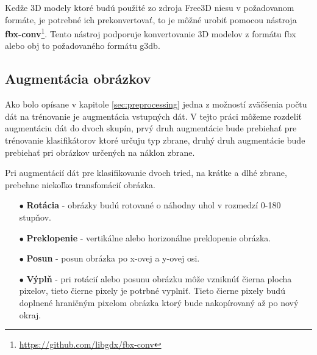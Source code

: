 Kedže 3D modely ktoré budú použité zo zdroja Free3D niesu v požadovanom formáte, je potrebné ich prekonvertovať, to je môžné urobiť
    pomocou nástroja \textbf{fbx-conv}\footnote{\url{https://github.com/libgdx/fbx-conv}}.
Tento nástroj podporuje konvertovanie 3D modelov z formátu fbx alebo obj to požadovaného formátu g3db.

\subsection{Augmentácia obrázkov}
Ako bolo opísane v kapitole \ref{sec:preprocessing} jedna z možností zväčšenia počtu dát na trénovanie je augmentácia vstupných dát.
V tejto práci môžeme rozdeliť augmentáciu dát do dvoch skupín, prvý druh augmentácie bude prebiehať pre trénovanie klasifikátorov ktoré
    určuju typ zbrane, druhý druh augmentácie bude prebiehať pri obrázkov určených na náklon zbrane.

Pri augmentácií dát pre klasifikovanie dvoch tried, na krátke a dlhé zbrane, prebehne niekoľko transfomácií obrázka.
\begin{enumerate}
    \item[$\bullet$] \textbf{Rotácia} - obrázky budú rotované o náhodny uhol v rozmedzí 0-180 stupňov.
    \item[$\bullet$] \textbf{Preklopenie} - vertikálne alebo horizonálne preklopenie obrázka.
    \item[$\bullet$] \textbf{Posun} - posun obrázka po x-ovej a y-ovej osi.
    \item[$\bullet$] \textbf{Výplň} - pri rotácií alebo posunu obrázku môže vzniknúť čierna plocha pixelov, tieto čierne pixely je potrbné vyplniť.
    Tieto čierne pixely budú doplnené hraničným pixelom obrázka ktorý bude nakopírovaný až po nový okraj.
\end{enumerate}

\begin{comment}
    - Opisat argumenty datagen v Keras ktore chcem pouzivat.
\end{comment}


